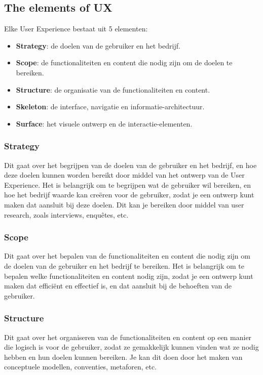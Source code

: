 \documentclass[nonacm, sigconf, balance=true]{acmart}
\begin{document}
    \subsection{The elements of UX}
    Elke User Experience bestaat uit 5 elementen:
    \begin{itemize}
        \item \textbf{Strategy}: de doelen van de gebruiker en het bedrijf.
        \item \textbf{Scope}: de functionaliteiten en content die nodig zijn om de doelen te bereiken.
        \item \textbf{Structure}: de organisatie van de functionaliteiten en content.
        \item \textbf{Skeleton}: de interface, navigatie en informatie-architectuur.
        \item \textbf{Surface}: het visuele ontwerp en de interactie-elementen.
    \end{itemize}

    \subsubsection{Strategy}
    Dit gaat over het begrijpen van de doelen van de gebruiker en het bedrijf, en hoe deze doelen kunnen worden bereikt door middel van het ontwerp van de User Experience.
    Het is belangrijk om te begrijpen wat de gebruiker wil bereiken, en hoe het bedrijf waarde kan creëren voor de gebruiker, zodat je een ontwerp kunt maken dat aansluit bij deze doelen.
    Dit kan je bereiken door middel van user research, zoals interviews, enquêtes, etc.

    \subsubsection{Scope}
    Dit gaat over het bepalen van de functionaliteiten en content die nodig zijn om de doelen van de gebruiker en het bedrijf te bereiken.
    Het is belangrijk om te bepalen welke functionaliteiten en content nodig zijn, zodat je een ontwerp kunt maken dat efficiënt en effectief is, en dat aansluit bij de behoeften van de gebruiker.

    \subsubsection{Structure}
    Dit gaat over het organiseren van de functionaliteiten en content op een manier die logisch is voor de gebruiker, zodat ze gemakkelijk kunnen vinden wat ze nodig hebben en hun doelen kunnen bereiken.
    Je kan dit doen door het maken van conceptuele modellen, conventies, metaforen, etc.
\end{document}
